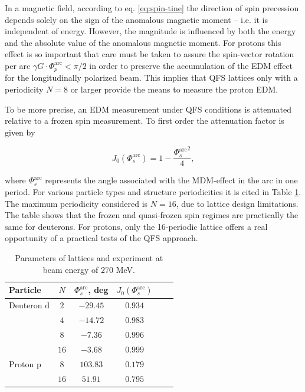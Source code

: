 \documentclass[submitting]{nst}
\begin{document}
\par In a magnetic field, according to eq. \ref{eq:spin-tine} the direction of spin precession depends solely on the sign of the anomalous magnetic moment -- i.e. it is independent of energy. However, the magnitude is influenced by both the energy and the absolute value of the anomalous magnetic moment. For protons this effect is so important that care must be taken to assure the spin-vector rotation per arc $\gamma G \cdot \Phi_{p}^{\text{arc}} < \pi/2$ in order to preserve the accumulation of the EDM effect for the longitudinally polarized beam. This implies that QFS lattices only with a periodicity $N=8$ or larger provide the means to measure the proton EDM.

\par To be more precise, an EDM measurement under QFS conditions is attenuated relative to a frozen spin measurement. To first order the attenuation factor is given by \cite{consider}

\begin{equation}
	J_{0}(\Phi_s^{\textrm{arc}})=1-\frac{{\Phi_s^{\textrm{arc}}}^2}{4},
	\label{eq:edm}
\end{equation}

\noindent where $\Phi_s^{\textrm{arc}}$ represents the angle associated with the MDM-effect in the arc in one period. For various particle types and structure periodicities it is cited in Table \ref{tab:edm}. The maximum periodicity considered is $N=16$, due to lattice design limitations. The table shows that the frozen and quasi-frozen spin regimes are practically the same for deuterons. For protons, only the 16-periodic lattice offers a real opportunity of a practical tests of the QFS approach.

\begin{table}[!htb]
	\caption{Parameters of lattices and experiment at beam energy of $270$ MeV.}
	\label{tab:edm}
	\begin{tabular*}{8cm} {@{\extracolsep{\fill} } lccccc}
		\toprule
		Particle & $N$ & $\Phi_s^{\textrm{arc}}$, deg & $J_{0}(\Phi_s^{\textrm{arc}})$ \\
		\midrule
		Deuteron $\text{d}$ & $2$   & $-29.45$ & $0.934$ \\
				 			& $4$   & $-14.72$ & $0.983$ \\
				 			& $8$   & $-7.36$ & $0.996$ \\
				 			& $16$   & $-3.68$ & $0.999$ \\
		Proton $\text{p}$ & $8$  &  $103.83$	   & $0.179$\\
						  & $16$  &  $51.91$	   & $0.795$\\
		\bottomrule
	\end{tabular*}
\end{table}
\end{document}
